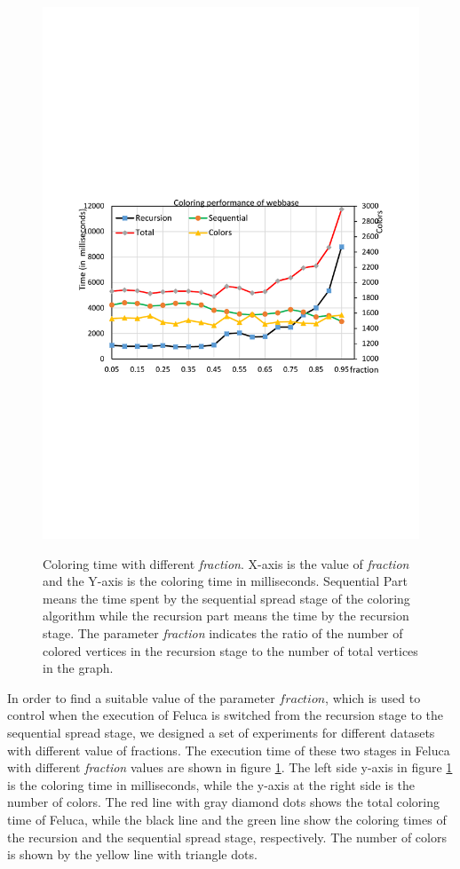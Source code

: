 \begin{figure}[t]
{		\includegraphics[scale=0.2]{figure/exp/webbase.pdf}
	}
	\caption{Coloring time with different \emph{fraction}. 
		X-axis is the value of \emph{fraction} and the Y-axis is the coloring time in milliseconds. Sequential Part means the time spent by the sequential spread stage of the coloring algorithm while the recursion part means the time by the recursion stage. The parameter \emph{fraction} indicates the ratio of the number of colored vertices in the recursion stage to the number of total vertices in the graph.}
	\label{fig:coloring}
\end{figure}

In order to find a suitable value of the parameter $fraction$, which is used to control when the execution of Feluca is switched from the recursion stage to the sequential spread stage, we designed a set of experiments for different datasets with different value of fractions. The execution time of these two stages in Feluca with different \emph{fraction} values are shown in figure \ref{fig:coloring}. The left side y-axis in figure \ref{fig:coloring} is the coloring time in milliseconds, while the y-axis at the right side is the number of colors. The red line with gray diamond dots shows the total coloring time of Feluca, while the black line and the green line show the coloring times of the recursion and the sequential spread stage, respectively. The number of colors is shown by the yellow line with triangle dots.

